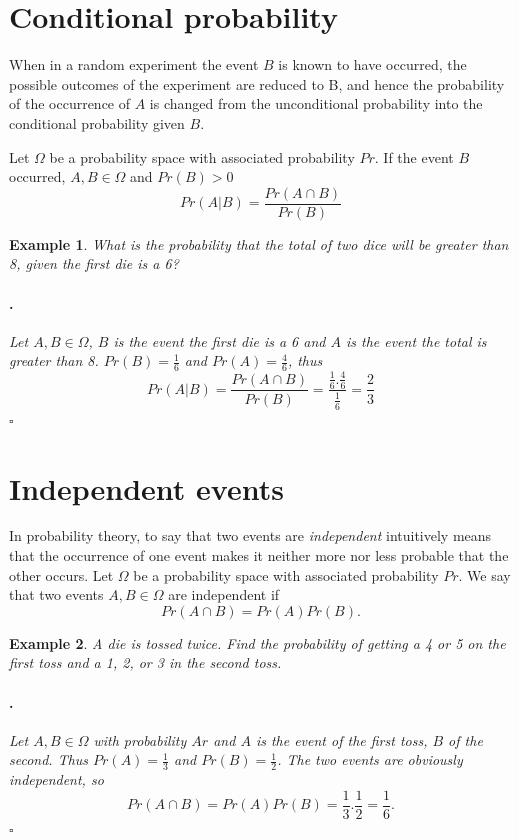 \documentclass[12pt, a4paper,leqno]{report}
\newenvironment{solution}{\paragraph{\normalfont{\textit{Solution}}.}}{\hfill\null$\square$}
\theoremstyle{normal}
\theoremstyle{normal}
\newtheorem{example}{Example}[chapter]
\begin{document}
		\section{Conditional probability}	
	When in a random experiment the event $B$ is known to have occurred, the possible outcomes of the experiment are reduced to B, and hence the probability of the occurrence of $A$ is changed from the unconditional probability into the conditional probability given $B$.
	
	Let $\Omega$ be a probability space with associated probability $Pr$. If the event $B$ occurred, $A,B\in\Omega$ and $Pr(B) > 0$
	\[ Pr(A|B) = \frac{Pr(A\cap B)}{Pr(B)} \] 
	
	\begin{example}
		What is the probability that the total of two dice will be greater than 8, given the first die is a 6?
		\begin{solution}
			Let $A, B\in\Omega$, $B$ is the event the first die is a 6 and $A$ is the event the total is greater than 8.
			$Pr(B) = \frac{1}{6}$ and $Pr(A) = \frac{4}{6}$, thus
			\[ Pr(A|B) = \frac{Pr(A\cap B)}{Pr(B)} = \frac{\frac{1}{6}.\frac{4}{6}}{\frac{1}{6}} = \frac{2}{3} \]
		\end{solution}
	\end{example}
	
	\section{Independent events}
	In probability theory, to say that two events are \textit{independent} intuitively means that the occurrence of one event makes it neither more nor less probable that the other occurs.
	Let $\Omega$ be a probability space with associated probability $Pr$.
	We say that two events $A, B\in\Omega$ are independent if
	\[ Pr(A\cap B) = Pr(A)Pr(B). \]
	
	\begin{example}
		A die is tossed twice. Find the probability of getting a 4 or 5 on the first toss and a 1, 2, or 3 in the second toss.
		\begin{solution}
			Let $A, B\in\Omega$ with probability $Ar$ and $A$ is the event of the first toss, $B$ of the second. Thus $Pr(A) = \frac{1}{3}$ and $Pr(B) = \frac{1}{2}$. The two events are obviously independent, so
			\[ Pr(A\cap B) = Pr(A)Pr(B) = \frac{1}{3}.\frac{1}{2} = \frac{1}{6}. \] 
		\end{solution}
	\end{example}	
	
\end{document}
